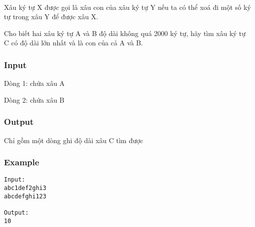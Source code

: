 

 

Xâu ký tự X được gọi là xâu con của xâu ký tự Y nếu ta có thể xoá đi một số ký tự trong xâu Y để được xâu X.

Cho biết hai xâu ký tự A và B độ dài không quá 2000 ký tự, hãy tìm xâu ký tự C có độ dài lớn nhất và là con của cả A và B.

\subsubsection{Input}

Dòng 1: chứa xâu A

Dòng 2: chứa xâu B

\subsubsection{Output}

Chỉ gồm một dòng ghi độ dài xâu C tìm được

\subsubsection{Example}
\begin{verbatim}
Input:
abc1def2ghi3
abcdefghi123

Output:
10
\end{verbatim}